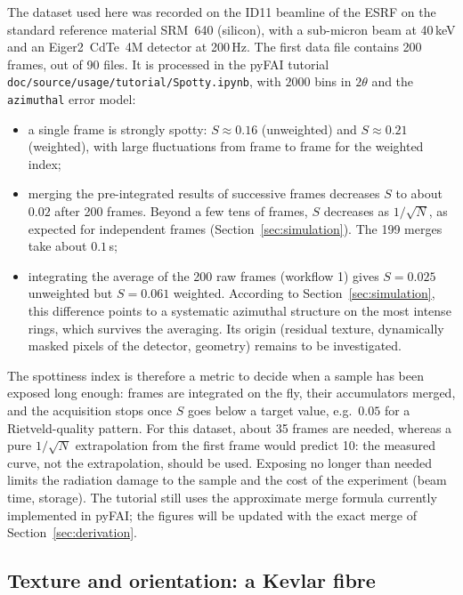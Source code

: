 \documentclass[a4paper,11pt]{article}
\begin{document}
The dataset used here was recorded on the ID11 beamline of the ESRF on the standard reference material
SRM~640 (silicon), with a sub-micron beam at 40\,keV and an Eiger2~CdTe~4M detector at 200\,Hz. The first
data file contains 200 frames, out of 90 files. It is processed in the pyFAI tutorial
\nolinkurl{doc/source/usage/tutorial/Spotty.ipynb}, with $2000$ bins in $2\theta$ and the
\texttt{azimuthal} error model:
\begin{itemize}
\item a single frame is strongly spotty: $S\approx0.16$ (unweighted) and $S\approx0.21$ (weighted), with
  large fluctuations from frame to frame for the weighted index;
\item merging the pre-integrated results of successive frames decreases $S$ to about $0.02$ after 200
  frames. Beyond a few tens of frames, $S$ decreases as $1/\sqrt{N}$, as expected for independent frames
  (Section~\ref{sec:simulation}). The 199 merges take about $0.1$\,s;
\item integrating the average of the 200 raw frames (workflow 1) gives $S=0.025$ unweighted but
  $S=0.061$ weighted. According to Section~\ref{sec:simulation}, this difference points to a systematic
  azimuthal structure on the most intense rings, which survives the averaging. Its origin (residual
  texture, dynamically masked pixels of the detector, geometry) remains to be investigated.
\end{itemize}

The spottiness index is therefore a metric to decide when a sample has been exposed long enough:
frames are integrated on the fly, their accumulators merged, and the acquisition stops once $S$ goes
below a target value, e.g.\ $0.05$ for a Rietveld-quality pattern. For this dataset, about 35 frames are
needed, whereas a pure $1/\sqrt{N}$ extrapolation from the first frame would predict 10: the measured
curve, not the extrapolation, should be used. Exposing no longer than needed limits the radiation
damage to the sample and the cost of the experiment (beam time, storage). The tutorial still uses the
approximate merge formula currently implemented in pyFAI; the figures will be updated with the exact
merge of Section~\ref{sec:derivation}.

\subsection{Texture and orientation: a Kevlar fibre}
\label{sec:kevlar}
\end{document}
